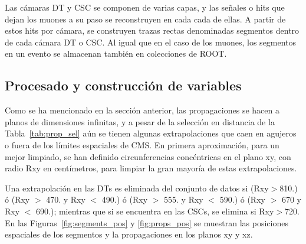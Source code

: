 Las c\'amaras DT y CSC se componen de varias capas, y las señales o hits que dejan los muones a su paso se reconstruyen en cada cada de ellas. A partir de estos hits por c\'amara, se construyen trazas rectas denominadas segmentos dentro de cada c\'amara DT o CSC. Al igual que en el caso de los muones, los segmentos en un evento se almacenan tambi\'en en colecciones de ROOT.



\subsection{Procesado y construcci\'on de variables}\label{sec:procesado}

Como se ha mencionado en la secci\'on anterior, las propagaciones se hacen a planos de dimensiones infinitas, y a pesar de la selecci\'on en distancia de la Tabla~\ref{tab:prop_sel} a\'un se tienen algunas extrapolaciones que caen en agujeros o fuera de los l\'imites espaciales de CMS. En primera aproximaci\'on, para un mejor limpiado, se han definido circunferencias conc\'entricas en el plano xy, con radio Rxy en cent\'imetros, para limpiar la gran mayor\'ia de estas extrapolaciones. 

Una extrapolaci\'on en las DTs es eliminada del conjunto de datos si (Rxy$>$810.) \'o (Rxy $>$ 470. y Rxy $<$ 490.) \'o (Rxy $>$ 555. y  Rxy $<$ 590.) \'o (Rxy $>$ 670 y Rxy $<$ 690.); mientras que si se encuentra en las CSCs, se elimina si Rxy$>$720. En las Figuras~\ref{fig:segments_pos} y \ref{fig:props_pos} se muestran las posiciones espaciales de los segmentos y la propagaciones en los planos xy y xz.


